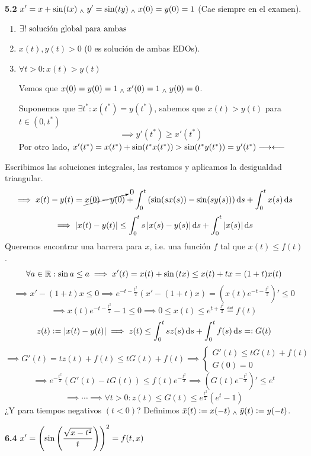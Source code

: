 \textbf{5.2} $\displaystyle x' = x + \sin(tx) \; _{\wedge} \; y' = \sin(ty) \; _{\wedge} \; x(0) = y(0) = 1$ (Cae siempre en el examen).
\begin{enumerate}
	\item $\exists ! \text{ solución global para ambas}$
	\item $x(t), y(t) > 0$ (0 es solución de ambas EDOs).
	\item $\forall t > 0 : x(t) > y(t)$
	      \begin{dem}
		      Vemos que $x(0)=y(0) = 1 \; _{\wedge} \; x'(0) = 1 \; _{\wedge} \; y(0) = 0$.

		      Suponemos que $\exists t^* : x(t^*) = y(t^*)$, sabemos que $x(t) > y(t)$ para $t\in(0, t^*)$
		      \[\implies y'(t^*) \geq x'(t^*)\]
		      Por otro lado, $x'(t^*) = x(t^*) + \sin(t^*x(t^*)) > \sin(t^*y(t^*)) = y'(t^*) \longrightarrow\longleftarrow$
	      \end{dem}
\end{enumerate}
Escribimos las soluciones integrales, las restamos y aplicamos la desigualdad triangular.
\[\implies x(t) - y(t) = \cancelto{0}{x(0) - y(0)} + \int_{0}^{t} \left(\sin(sx(s)) - \sin(sy(s))\right) \odif{s} + \int_{0}^{t} x(s)\odif{s}\]
\[\implies \abs{x(t) - y(t)} \leq \int_{0}^{t} s \abs{x(s) - y(s)} \odif{s} + \int_{0}^{t} \abs{x(s)} \odif{s}\]
Queremos encontrar una barrera para $x$, i.e. una función $f$ tal que $x(t) \leq f(t)$.
\[\forall a \in \mathbb{R} : \sin{a} \leq a \implies x'(t) = x(t) + \sin{(tx)} \leq x(t) + tx = (1+t)x(t)\]
\[\implies x'-(1+t)x \leq 0 \implies e^{-t-\frac{t^2}{2}}\left(x'-(1+t)x\right) = \left(x(t)e^{-t-\frac{t^2}{2}}\right)'\leq 0\]
\[\implies x(t)e^{-t-\frac{t^2}{2}} -1 \leq 0 \implies 0 \leq x(t) \leq e^{t+\frac{t^2}{2}} \eqdef f(t)\]
\[z(t) \defeq \abs{x(t) - y(t)} \implies z(t) \leq \int_{0}^{t} s z(s) \odif{s} + \int_{0}^{t} f(s) \odif{s} \eqdef G(t)\]
\[\implies G'(t) = tz(t) +f(t) \leq tG(t) + f(t) \implies \begin{cases}
		G'(t) \leq tG(t) + f(t) \\
		G(0) = 0
	\end{cases}\]
\[\implies e^{-\frac{t^2}{2}}\left(G'(t) - tG(t)\right) \leq f(t) e^{-\frac{t^2}{2}} \implies \left(G(t) e^{-\frac{t^2}{2}}\right)' \leq e^{t}\]
\[\implies \cdots \implies \forall t > 0 : z(t)\leq G(t) \leq e^{\frac{t^2}{2}}\left(e^t -1 \right)\]
¿Y para tiempos negativos $(t < 0)$? Definimos $\bar{x}(t) \vcentcolon= x(-t) \; _{\wedge} \; \bar{y}(t) \vcentcolon= y(-t)$.

\textbf{6.4} $\displaystyle x' = {\left(\sin\left(\frac{\sqrt{x-t^2}}{t}\right)\right)}^2 = f(t, x)$

